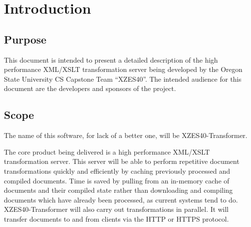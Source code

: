 \section{Introduction}

\subsection{Purpose}

This document is intended to present a detailed description of the high performance XML/XSLT transformation server being developed by the Oregon State University CS Capstone Team ``XZES40''.
The intended audience for this document are the developers and sponsors of the project.


\subsection{Scope}

The name of this software, for lack of a better one, will be XZES40-Transformer.

The core product being delivered is a high performance XML/XSLT transformation server.
This server will be able to perform repetitive document transformations quickly and efficiently by caching previously processed and compiled documents.
Time is saved by pulling from an in-memory cache of documents and their compiled state rather than downloading and compiling documents which have already been processed, as current systems tend to do.
XZES40-Transformer will also carry out transformations in parallel.
It will transfer documents to and from clients via the HTTP or HTTPS protocol.

